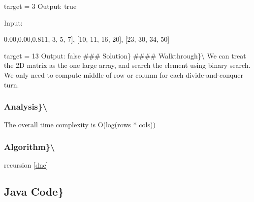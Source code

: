 \documentclass[]{book}
\newenvironment{Shaded}{\begin{snugshade}}{\end{snugshade}}
\newcommand{\DecValTok}[1]{\textcolor[rgb]{0.00,0.00,0.81}{#1}}
\newcommand{\NormalTok}[1]{#1}
\begin{document}
target = 3
Output: true

Input:

\begin{Shaded}
\begin{Highlighting}[]
\NormalTok{[}\DecValTok{1}\NormalTok{,   }\DecValTok{3}\NormalTok{,  }\DecValTok{5}\NormalTok{,  }\DecValTok{7}\NormalTok{],}
\NormalTok{[}\DecValTok{10}\NormalTok{, }\DecValTok{11}\NormalTok{, }\DecValTok{16}\NormalTok{, }\DecValTok{20}\NormalTok{],}
\NormalTok{[}\DecValTok{23}\NormalTok{, }\DecValTok{30}\NormalTok{, }\DecValTok{34}\NormalTok{, }\DecValTok{50}\NormalTok{]}
\end{Highlighting}
\end{Shaded}

target = 13
Output: false
\#\#\# Solution\}
\#\#\#\# Walkthrough\}\textbackslash{}
We can treat the 2D matrix as the one large array, and search the element using binary search. We only need to compute
middle of row or column for each divide-and-conquer turn.

\hypertarget{analysis-47}{%
\subsubsection{Analysis\}\textbackslash{}}\label{analysis-47}}

The overall time complexity is O(log(rows * cols))

\hypertarget{algorithm-47}{%
\subsubsection{Algorithm\}\textbackslash{}}\label{algorithm-47}}

recursion \ref{dnc}

\hypertarget{java-code-38}{%
\subsection{Java Code\}}\label{java-code-38}}
\end{document}

